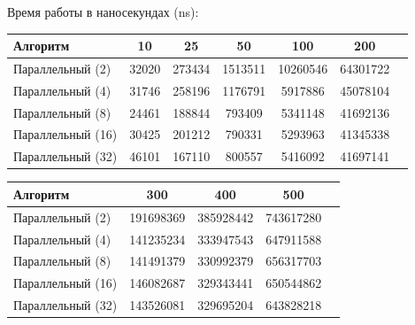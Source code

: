 \documentclass[utf8x, 12pt]{G7-32} %
\begin{document}
Время работы в наносекундах (ns):\\
\begin{tabular}{l*{5}{c}r}
	Алгоритм & 10 & 25 & 50 & 100 & 200 \\
	\hline
	Параллельный (2) & 32020 & 273434 & 1513511 & 10260546 & 64301722 \\
	Параллельный (4) & 31746 & 258196 & 1176791 & 5917886 & 45078104 \\
	Параллельный (8) & 24461 & 188844 & 793409 & 5341148 & 41692136 \\
	Параллельный (16) & 30425 & 201212 & 790331 & 5293963 & 41345338 \\
	Параллельный (32) & 46101 & 167110 & 800557 & 5416092 & 41697141 \\
\end{tabular}
\begin{tabular}{l*{3}{c}r}
	Алгоритм & 300 & 400 & 500 \\
	\hline
	Параллельный (2) & 191698369 & 385928442 & 743617280 \\
	Параллельный (4) & 141235234 & 333947543 & 647911588 \\
	Параллельный (8) & 141491379 & 330992379 & 656317703 \\
	Параллельный (16) & 146082687 & 329343441 & 650544862 \\
	Параллельный (32) & 143526081 & 329695204 & 643828218 \\
\end{tabular}

\newpage
\end{document}
